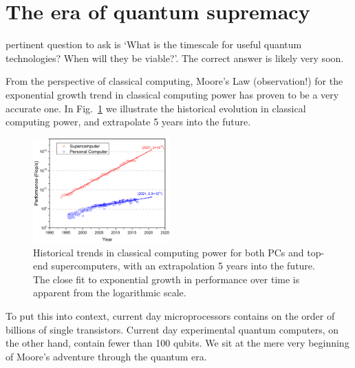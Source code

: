 \section{The era of quantum supremacy} \label{sec:era_quant} 

 pertinent question to ask is `What is the timescale for useful quantum technologies? When will they be viable?'. The correct answer is likely very soon.

From the perspective of classical computing, Moore's Law (observation!) for the exponential growth trend in classical computing power has proven to be a very accurate one. In Fig.~\ref{fig:moores_law} we illustrate the historical evolution in classical computing power, and extrapolate 5 years into the future.

\begin{figure}[!htb]
\includegraphics[width=0.47\textwidth]{moores_law}
\caption{Historical trends in classical computing power for both PCs and top-end supercomputers, with an extrapolation 5 years into the future. The close fit to exponential growth in performance over time is apparent from the logarithmic scale.} \label{fig:moores_law}
\end{figure}

To put this into context, current day microprocessors contains on the order of billions of single transistors. Current day  experimental quantum computers, on the other hand, contain fewer than 100 qubits. We sit at the mere very beginning of Moore's adventure through the quantum era.


